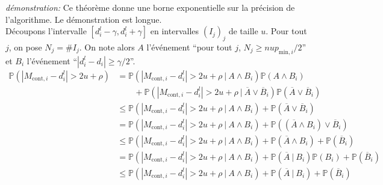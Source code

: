 \textit{démonstration:} Ce théorème donne une borne exponentielle sur la précision de l'algorithme. Le démonstration est longue.\\

Découpons l'intervalle \([d_i^l - \gamma, d_i^l + \gamma]\) en intervalles \((I_j)_j\) de taille \(u\). Pour tout \(j\), on pose \(N_j = \#I_j\). On note alors \(A\) l'événement ``pour tout \(j\), \(N_j \geq nup_{\text{min}, i}/2\)'' et \(B_i\) l'événement ``\(|d_i^l - d_i| \geq \gamma/2\)''.\\
\begin{align*}
    \mathbb P\left( |M_{\text{cont}, i} - d_i^l| > 2u + \rho \right) & = \mathbb P\left( |M_{\text{cont}, i} - d_i^l| > 2u + \rho \ | \ A \wedge B_i\right)\mathbb P\left( A \wedge B_i \right)\\
    & \quad \quad  + \mathbb P\left( |M_{\text{cont}, i} - d_i^l| > 2u + \rho \ | \ \overline A \vee \overline B_i\right) \mathbb P \left( \overline A \vee \overline B_i \right)\\
    & \leq \mathbb P\left( |M_{\text{cont}, i} - d_i^l| > 2u + \rho \ | \ A \wedge B_i\right) +   \mathbb P \left( \overline A \vee \overline B_i \right)\\
    & = \mathbb P\left( |M_{\text{cont}, i} - d_i^l| > 2u + \rho \ | \ A \wedge B_i\right) +   \mathbb P \left( (\overline A \wedge B_i) \vee \overline B_i \right)\\
    & \leq \mathbb P\left( |M_{\text{cont}, i} - d_i^l| > 2u + \rho \ | \ A \wedge B_i\right) +   \mathbb P \left( \overline A \wedge B_i\right) + \mathbb P \left( \overline B_i \right)\\
    & = \mathbb P\left( |M_{\text{cont}, i} - d_i^l| > 2u + \rho \ | \ A \wedge B_i\right) +   \mathbb P \left( \overline A \ |\ B_i\right)\mathbb P (B_i) + \mathbb P \left( \overline B_i \right)\\
    & \leq \mathbb P\left( |M_{\text{cont}, i} - d_i^l| > 2u + \rho \ | \ A \wedge B_i\right) +   \mathbb P \left( \overline A \ |\ B_i\right) + \mathbb P \left( \overline B_i \right)\\
\end{align*}

